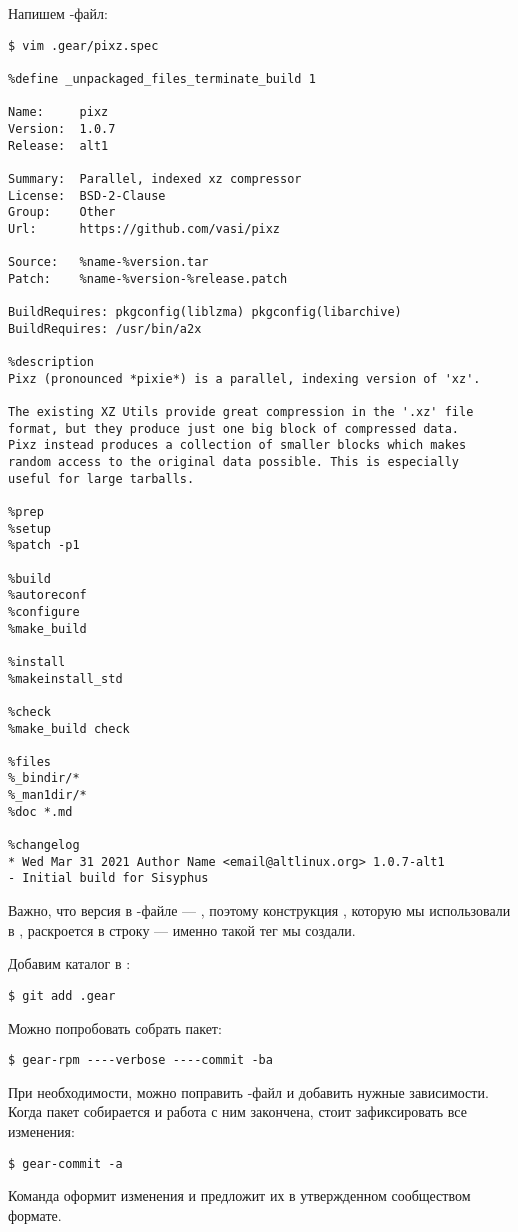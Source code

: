 Напишем -файл:
\begin{verbatim}
$ vim .gear/pixz.spec

%define _unpackaged_files_terminate_build 1

Name:     pixz
Version:  1.0.7
Release:  alt1

Summary:  Parallel, indexed xz compressor
License:  BSD-2-Clause
Group:    Other
Url:      https://github.com/vasi/pixz

Source:   %name-%version.tar
Patch:    %name-%version-%release.patch

BuildRequires: pkgconfig(liblzma) pkgconfig(libarchive)
BuildRequires: /usr/bin/a2x

%description
Pixz (pronounced *pixie*) is a parallel, indexing version of 'xz'.

The existing XZ Utils provide great compression in the '.xz' file
format, but they produce just one big block of compressed data.
Pixz instead produces a collection of smaller blocks which makes
random access to the original data possible. This is especially
useful for large tarballs.

%prep
%setup
%patch -p1

%build
%autoreconf
%configure
%make_build

%install
%makeinstall_std

%check
%make_build check

%files
%_bindir/*
%_man1dir/*
%doc *.md

%changelog
* Wed Mar 31 2021 Author Name <email@altlinux.org> 1.0.7-alt1
- Initial build for Sisyphus

\end{verbatim}

Важно, что версия в -файле --- , поэтому конструкция ,
которую мы использовали в , раскроется в строку  ---
именно такой тег  мы создали.

Добавим каталог  в :
\begin{verbatim}
$ git add .gear
\end{verbatim}

Можно попробовать собрать пакет:
\begin{verbatim}
$ gear-rpm ----verbose ----commit -ba
\end{verbatim}

При необходимости, можно поправить -файл и добавить нужные зависимости.
Когда пакет собирается и работа с ним закончена, стоит зафиксировать все изменения:
\begin{verbatim}
$ gear-commit -a
\end{verbatim}
Команда оформит изменения и предложит их в утвержденном сообществом формате.

